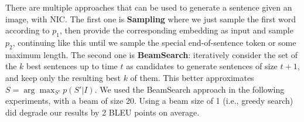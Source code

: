 There are multiple approaches that can be used to generate a sentence given
an image, with NIC. The first one is {\bf Sampling} where we just
sample the first word according to $p_1$, then provide the corresponding
embedding as input and sample $p_2$, continuing like this until we sample the
special end-of-sentence token or some maximum length.
The second  one is {\bf BeamSearch}: iteratively
consider the set of the $k$ best sentences up to time
$t$ as candidates to generate sentences of size $t+1$, and keep only the
resulting best $k$ of them. This better approximates
$S = \arg\max_{S'} p(S'|I)$.
We used the BeamSearch approach in the following experiments, with a
beam of size 20. Using a beam size of 1 (i.e., greedy search) did degrade our
results by 2 BLEU points on average.

